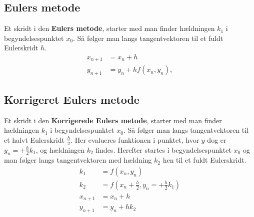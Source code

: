 \subsection*{Eulers metode}
Et skridt i den \textbf{Eulers metode}, starter med man finder hældningen $k_1$ i begyndelsespunktet $x_0$.
Så følger man langs tangentvektoren til et fuldt Eulerskridt $h$.
%
\begin{align*}
x_{n+1} & = x_n+h \\
y_{n+1} & = y_n + h f(x_n,y_n),
\end{align*}
%
%

%
\subsection*{Korrigeret Eulers metode}
Et skridt i den \textbf{Korrigerede Eulers metode}, starter med man finder hældningen $k_1$ i begyndelsespunktet $x_0$.
Så følger man langs tangentvektoren til et halvt Eulerskridt $\frac{h}{2}$.
Her evalueres funktionen i punktet, hvor $y$ dog er $ y_n = + \frac{h}{2} k_1$,
og hældningen $k_2$ findes.
Herefter startes i begyndelsespunktet $x_0$ og man følger langs tangentvektoren med hældning $k_2$ hen til et fuldt Eulerskridt.
%
\begin{align*}
k_1 & = f(x_n , y_n) \\
k_2 & = f(x_n + \frac{h}{2} , y_n = + \frac{h}{2} k_1 )  \\
x_{n+1} & = x_n+h \\
y_{n+1} & = y_n + h k_2 
\end{align*}
% 
% 
%

